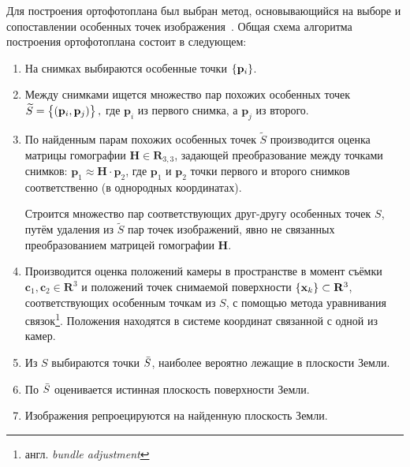 \documentclass[a4paper,12pt]{article}
\begin{document}
Для построения ортофотоплана был выбран метод, основывающийся на выборе и 
сопоставлении особенных точек изображения~\cite{cham98matchframework, brown03recognising, mclauchlan02mosaic}.
Общая схема алгоритма построения ортофотоплана состоит в следующем:
\begin{enumerate}
  \item На снимках выбираются особенные точки $\cbr{ \mathbf{p}_i }$.
  
  \item Между снимками ищется множество пар похожих особенных 
  точек $\widetilde{S} = \cbr{(\mathbf{p}_i, \mathbf{p}_j )},$
  где $\mathbf{p}_i$ из первого снимка, а $\mathbf{p}_j$ из второго.
  
  \item По найденным парам похожих особенных точек $\widetilde{S}$ производится 
  оценка матрицы гомографии $\mathbf{H} \in \mathbf{R}_{3, 3}$, 
  задающей преобразование между точками снимков: 
  $\mathbf{p}_1 \approx \mathbf{H} \cdot \mathbf{p}_2$, 
  где $\mathbf{p}_1$ и $\mathbf{p}_2$ точки первого и второго снимков 
  соответственно (в однородных координатах). 
  
  Строится множество пар соответствующих друг-другу особенных точек $S$, путём
  удаления из $\widetilde{S}$ пар точек изображений, явно не связанных
  преобразованием матрицей гомографии $\mathbf{H}$.
  
  \item Производится оценка положений камеры в пространстве в момент съёмки
  $\mathbf{c}_1, \mathbf{c}_2 \in \mathbf{R}^3$ и
  положений точек снимаемой поверхности $\cbr{ \mathbf{x}_k } \subset \mathbf{R}^3$,
  соответствующих особенным точкам из $S$, с помощью метода уравнивания
  связок\footnote{англ. \textit{bundle adjustment}}.
  Положения находятся в системе координат связанной с одной из камер.
  
  \item Из $S$ выбираются точки $\Bar{S}$, наиболее вероятно лежащие в 
  плоскости Земли.
  
  \item По $\Bar{S}$ оценивается истинная плоскость поверхности Земли.
  
  \item Изображения репроецируются на найденную плоскость Земли.
  
\end{enumerate}
  
\end{document}
